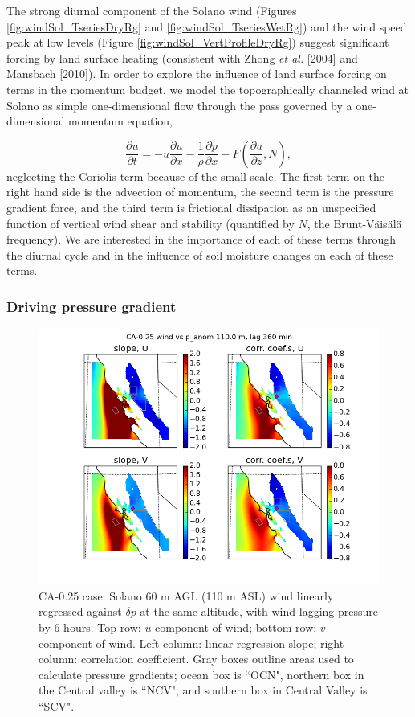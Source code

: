 The strong diurnal component of the Solano wind (Figures \ref{fig:windSol_TseriesDryRg} and \ref{fig:windSol_TseriesWetRg}) and the wind speed peak at low levels (Figure \ref{fig:windSol_VertProfileDryRg}) suggest significant forcing by land surface heating (consistent with Zhong \textit{et al.} [2004] and Mansbach [2010]).  In order to explore the influence of land surface forcing on terms in the momentum budget, we model the topographically channeled wind at Solano as simple one-dimensional flow through the pass governed by a one-dimensional momentum equation,

\begin{equation}
\frac{\partial u}{\partial t} = -u\frac{\partial u}{\partial x} -\frac{1}{\rho} \frac{\partial p}{\partial x} - F\left(\frac{\partial u}{\partial z}, N\right),
\label{eqn:windSol_momentum}
\end{equation}
neglecting the Coriolis term because of the small scale.  The first term on the right hand side is the advection of momentum, the second term is the pressure gradient force, and the third term is frictional dissipation as an unspecified function of vertical wind shear and stability (quantified by $N$, the Brunt-V\"ais\"al\"a frequency).  We are interested in the importance of each of these terms through the diurnal cycle and in the influence of soil moisture changes on each of these terms.

\subsubsection{Driving pressure gradient}

\begin{figure}[here]
\includegraphics[width=1\textwidth]{ch3-wind/img/corr_wind_panom_lev110_lag12_CA0pt25.png}
\caption{CA-0.25 case: Solano 60 m AGL (110 m ASL) wind linearly regressed against $\delta p$ at the same altitude, with wind lagging pressure by 6 hours.  Top row: $u$-component of wind; bottom row: $v$-component of wind.  Left column: linear regression slope; right column: correlation coefficient.  Gray boxes outline areas used to calculate pressure gradients; ocean box is ``OCN", northern box in the Central valley is ``NCV", and southern box in Central Valley is ``SCV".}
\label{fig:windSol_CorrMap0pt25}
\end{figure}

